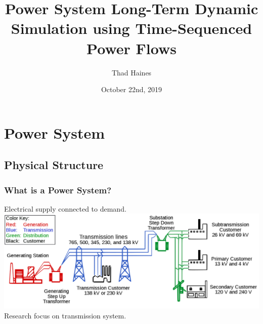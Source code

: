\documentclass[14pt, unknownkeysallowed]{beamer}
\title{Power System Long-Term Dynamic Simulation using Time-Sequenced \\Power Flows}
\author{Thad Haines}
\institute[MT TECH]{Montana Technological University - Master's Thesis Research Project}
\date{October 22nd, 2019}
\begin{document}
	
\begin{frame}
	\titlepage
\end{frame}

\section{Power System}
\subsection{Physical Structure}
\begin{frame}
\frametitle{What is a Power System?}
Electrical supply connected to demand.\\ 
\includegraphics[width=\linewidth]{largeGrid}{\tiny \cite{powersystemSVG} } %
\\
Research focus on transmission system.
\end{frame}
\end{document}
